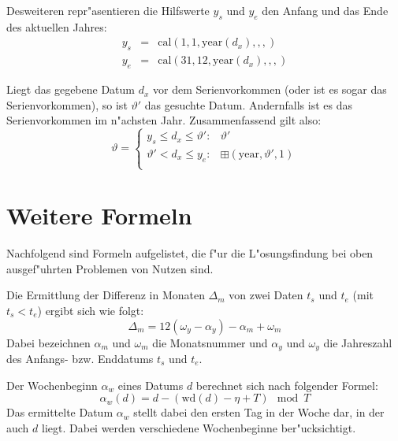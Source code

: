\documentclass[a4paper]{article}
\newcommand*{\yearf}{\mathrm{year}}
\newcommand*{\wdf}{\mathrm{wd}}
\newcommand*{\calf}{\mathrm{cal}}
\newcommand*{\addff}{\boxplus}
\numberwithin{equation}{section}
\begin{document}
Desweiteren repr"asentieren die Hilfswerte $y_s$ und $y_e$ den Anfang und das
Ende des aktuellen Jahres:
\begin{eqnarray}
  y_s & = & \calf(1, 1, \yearf(d_x), , , ) \\
  y_e & = & \calf(31, 12, \yearf(d_x), , , )
\end{eqnarray}

Liegt das gegebene Datum $d_x$ vor dem Serienvorkommen (oder ist es sogar das
Serienvorkommen), so ist $\vartheta'$ das gesuchte Datum. Andernfalls ist es das
Serienvorkommen im n"achsten Jahr. Zusammenfassend gilt also:
\begin{equation}
  \vartheta = \left\{\begin{array}{ll}
    y_s \le d_x \le \vartheta' : & \vartheta' \\
    \vartheta' < d_x \le y_e : & \addff(\yearf, \vartheta', 1) \\
    \end{array}\right.
\end{equation}



%
%
%
%
\section{Weitere Formeln}
Nachfolgend sind Formeln aufgelistet, die f"ur die L"osungsfindung bei oben
ausgef"uhrten Problemen von Nutzen sind.

Die Ermittlung der Differenz in Monaten $\Delta_m$ von zwei Daten $t_s$ und
$t_e$ (mit $t_s < t_e$) ergibt sich wie folgt:
\begin{equation}\label{eqn:monthDiff}
  \Delta_m = 12(\omega_y - \alpha_y) - \alpha_m + \omega_m
\end{equation}
Dabei bezeichnen $\alpha_m$ und $\omega_m$ die Monatsnummer und $\alpha_y$ und
$\omega_y$ die Jahreszahl des Anfangs- bzw. Enddatums $t_s$ und $t_e$.

Der Wochenbeginn $\alpha_w$ eines Datums $d$ berechnet sich nach folgender
Formel:
\begin{equation}\alpha_w(d) = d - (\wdf(d) - \eta + T) \mod T\end{equation}
Das ermittelte Datum $\alpha_w$ stellt dabei den ersten Tag in der Woche dar, in
der auch $d$ liegt. Dabei werden verschiedene Wochenbeginne ber"ucksichtigt.



%
%
%
%
\end{document}
